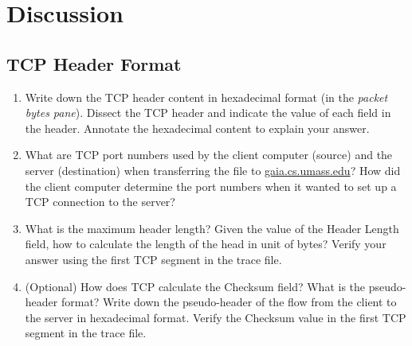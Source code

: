 \section{Discussion}

\subsection{TCP Header Format}\label{sec:tcp-head}

\begin{enumerate}
\item Write down the TCP header content in hexadecimal format (in the
  {\em packet bytes pane}). Dissect the TCP header and indicate the
  value of each field in the header. Annotate the
  hexadecimal content to explain your answer.
\item What are TCP port numbers used by the client computer (source)
  and the server (destination) when transferring the file to
  \url{gaia.cs.umass.edu}? How did the client computer determine the
  port numbers when it wanted to set up a TCP connection to the
  server?
\item What is the maximum header length? Given the value of the Header
  Length field, how to calculate the length of the head in unit of
  bytes? Verify your answer using the first TCP segment in the trace
  file.
\item (Optional) How does TCP calculate the Checksum field? What is
  the pseudo-header format? Write down the pseudo-header of the flow
  from the client to the server in hexadecimal format. Verify the
  Checksum value in the first TCP segment in the trace file.
\end{enumerate}

